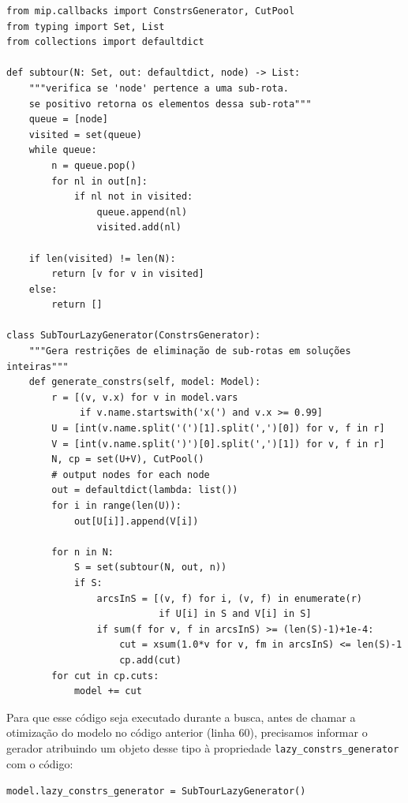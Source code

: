 \documentclass[a4paper,11pt,fleqn]{article}
\begin{document}
{\small
\begin{lstlisting}
from mip.callbacks import ConstrsGenerator, CutPool
from typing import Set, List
from collections import defaultdict

def subtour(N: Set, out: defaultdict, node) -> List:
    """verifica se 'node' pertence a uma sub-rota. 
    se positivo retorna os elementos dessa sub-rota"""
    queue = [node]
    visited = set(queue)
    while queue:
        n = queue.pop()
        for nl in out[n]:
            if nl not in visited:
                queue.append(nl)
                visited.add(nl)

    if len(visited) != len(N):
        return [v for v in visited]
    else:
        return []

class SubTourLazyGenerator(ConstrsGenerator):
    """Gera restrições de eliminação de sub-rotas em soluções inteiras"""
    def generate_constrs(self, model: Model):
        r = [(v, v.x) for v in model.vars
             if v.name.startswith('x(') and v.x >= 0.99]
        U = [int(v.name.split('(')[1].split(',')[0]) for v, f in r]
        V = [int(v.name.split(')')[0].split(',')[1]) for v, f in r]
        N, cp = set(U+V), CutPool()
        # output nodes for each node
        out = defaultdict(lambda: list())
        for i in range(len(U)):
            out[U[i]].append(V[i])

        for n in N:
            S = set(subtour(N, out, n))
            if S:
                arcsInS = [(v, f) for i, (v, f) in enumerate(r)
                           if U[i] in S and V[i] in S]
                if sum(f for v, f in arcsInS) >= (len(S)-1)+1e-4:
                    cut = xsum(1.0*v for v, fm in arcsInS) <= len(S)-1
                    cp.add(cut)
        for cut in cp.cuts:
            model += cut
\end{lstlisting}
}

Para que esse código seja executado durante a busca, antes de chamar a otimização do modelo no código anterior (linha 60), precisamos informar o gerador atribuindo um objeto desse tipo à propriedade \texttt{lazy\_constrs\_generator} com o código: 

\begin{center}
\texttt{model.lazy\_constrs\_generator = SubTourLazyGenerator()}
\end{center}
\end{document}

